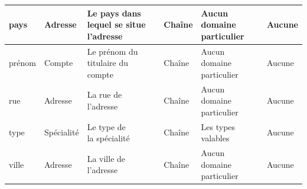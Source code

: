 \documentclass[a4paper, 11pt]{report}
\begin{document}
\begin{center}
\begin{longtable}{|p{2cm}|p{2cm}|p{3cm}|p{2cm}|p{2cm}|p{2cm}|}
        \hline
        pays & Adresse & \parbox[t]{3cm}{Le pays dans\\lequel se situe\\l'adresse\\}  & Chaîne & \parbox[t]{2cm}{Aucun\\ domaine particulier\\}  
        & Aucune \\
        \hline
        prénom & Compte & \parbox[t]{3cm}{Le prénom du titulaire du compte\\} & Chaîne & \parbox[t]{2cm}{Aucun\\ domaine particulier\\}
        & Aucune \\
        \hline
        rue & Adresse & \parbox[t]{3cm}{La rue de\\ l'adresse\\} & Chaîne & \parbox[t]{2cm}{Aucun\\ domaine particulier\\} & Aucune \\
        \hline
        type & Spécialité & \parbox[t]{3cm}{Le type de\\ la spécialité\\} & Chaîne & \parbox[t]{2cm}{Les types\\ valables\\} & Aucune\\
        \hline
        ville & Adresse & \parbox[t]{3cm}{La ville de\\ l'adresse\\} & Chaîne & \parbox[t]{2cm}{Aucun\\ domaine particulier\\} & Aucune \\
        \hline
        
\end{longtable}
\end{center}
\end{document}
